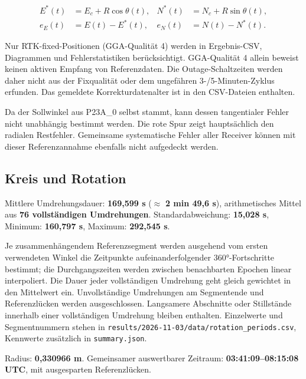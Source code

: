 \documentclass[11pt,a4paper]{article}
\numberwithin{equation}{section}
\numberwithin{figure}{section}
\begin{document}
\begin{equation}\begin{aligned} E^*(t)&=E_c+R\cos\theta(t), & N^*(t)&=N_c+R\sin\theta(t),\\ e_E(t)&=E(t)-E^*(t), & e_N(t)&=N(t)-N^*(t).\end{aligned}\label{eq:de-circle}\end{equation}

Nur RTK-fixed-Positionen (GGA-Qualität 4) werden in Ergebnis-CSV, Diagrammen und Fehlerstatistiken berücksichtigt. GGA-Qualität 4 allein beweist keinen aktiven Empfang von Referenzdaten. Die Outage-Schaltzeiten werden daher nicht aus der Fixqualität oder dem ungefähren 3-/\allowbreak{}5-Minuten-Zyklus erfunden. Das gemeldete Korrekturdatenalter ist in den CSV-Dateien enthalten.

Da der Sollwinkel aus P23A\_0 selbst stammt, kann dessen tangentialer Fehler nicht unabhängig bestimmt werden. Die rote Spur zeigt hauptsächlich den radialen Restfehler. Gemeinsame systematische Fehler aller Receiver können mit dieser Referenzannahme ebenfalls nicht aufgedeckt werden.

\subsection{Kreis und Rotation}

Mittlere Umdrehungsdauer: \textbf{169,599 s} (\ensuremath{\approx} \textbf{2 min 49,6 s}), arithmetisches Mittel aus \textbf{76 vollständigen Umdrehungen}. Standardabweichung: \textbf{15,028 s}, Minimum: \textbf{160,797 s}, Maximum: \textbf{292,545 s}.

Je zusammenhängendem Referenzsegment werden ausgehend vom ersten verwendeten Winkel die Zeitpunkte aufeinanderfolgender 360°-Fortschritte bestimmt; die Durchgangszeiten werden zwischen benachbarten Epochen linear interpoliert. Die Dauer jeder vollständigen Umdrehung geht gleich gewichtet in den Mittelwert ein. Unvollständige Umdrehungen am Segmentende und Referenzlücken werden ausgeschlossen. Langsamere Abschnitte oder Stillstände innerhalb einer vollständigen Umdrehung bleiben enthalten. Einzelwerte und Segmentnummern stehen in {\small\texttt{results/\allowbreak{}2026-11-03/\allowbreak{}data/\allowbreak{}rotation\_\allowbreak{}periods.csv}}, Kennwerte zusätzlich in {\small\texttt{summary.json}}.

Radius: \textbf{0,330966 m}. Gemeinsamer auswertbarer Zeitraum: \textbf{03:41:09–08:15:08 UTC}, mit ausgesparten Referenzlücken.
\end{document}
